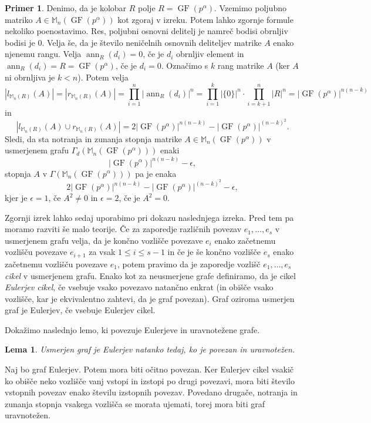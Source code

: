 \documentclass[a4paper, 12pt]{amsart}
\theoremstyle{definition} %
\newtheorem{primer}[definicija]{Primer}
\theoremstyle{plain} %
\newtheorem{lema}[definicija]{Lema}
\newcommand{\M}{\mathbb M}
\DeclareMathOperator{\ann}{ann}
\DeclareMathOperator{\GF}{GF}
\begin{document}
\begin{primer}
Denimo, da je kolobar $R$ polje $R=\GF(p^{\alpha})$. Vzemimo poljubno matriko $A\in \M_n(\GF(p^{\alpha}))$ kot zgoraj v izreku. Potem lahko zgornje formule nekoliko poenostavimo. Res, poljubni osnovni delitelj je namreč bodisi obrnljiv bodisi je 0. Velja še, da je število neničelnih osnovnih deliteljev matrike $A$ enako njenemu rangu. Velja $\ann_R(d_i) = 0$, če je $d_i$ obrnljiv element in $\ann_R(d_i) = R=\GF(p^{\alpha})$, če je $d_i=0$. Označimo s $k$ rang matrike $A$ (ker $A$ ni obrnljiva je $k<n$). Potem velja 
$$
|l_{\M_n(R)}(A)| = |r_{\M_n(R)}(A)|=\prod_{i=1}^n|\ann_R(d_i)|^n = \prod_{i=1}^k |\{0\}|^n\cdot \prod_{i=k+1}^n |R|^{n} =|\GF(p^{\alpha})|^{n(n-k)}
$$
in
$$
|l_{\M_n(R)} (A) \cup r_{\M_n(R)}(A)| = 2|\GF(p^{\alpha})|^{n(n-k)} - |\GF(p^{\alpha})|^{(n-k)^2}.
$$
Sledi, da sta notranja in zunanja stopnja matrike $A\in \M_n(\GF(p^{\alpha}))$ v usmerjenem grafu $\Gamma_d(\M_n(\GF(p^{\alpha})))$ enaki 
$$
|\GF(p^{\alpha})|^{n(n-k)} - \epsilon,
$$
stopnja $A$ v $\Gamma (\M_n(\GF(p^{\alpha})))$ pa je enaka
$$
 2|\GF(p^{\alpha})|^{n(n-k)} - |\GF(p^{\alpha})|^{(n-k)^2} - \epsilon,
$$
kjer je $\epsilon=1$, če $A^2\neq 0$ in $\epsilon = 2$, če je $A^2 = 0$. 
\end{primer}

Zgornji izrek lahko sedaj uporabimo pri dokazu naslednjega izreka. Pred tem pa moramo razviti še malo teorije. Če za zaporedje različnih povezav $e_1, \dots, e_s$ v usmerjenem grafu velja, da je končno vozlišče povezave $e_i$ enako začetnemu vozlišču povezave $e_{i+1}$ za vsak $1 \le i \le s-1$ in če je še končno vozlišče $e_s$ enako začetnemu vozlišču povezave $e_1$, potem pravimo da je zaporedje vozlišč $e_1,\dots,e_s$ \emph{cikel} v usmerjenem grafu. Enako kot za neusmerjene grafe definiramo, da je cikel \emph{Eulerjev cikel}, če vsebuje vsako povezavo natančno enkrat (in obišče vsako vozlišče, kar je ekvivalentno zahtevi, da je graf povezan). Graf oziroma usmerjen graf je Eulerjev, če vsebuje Eulerjev cikel.

Dokažimo naslednjo lemo, ki povezuje Eulerjeve in uravnotežene grafe.
\begin{lema}
\label{usmerjenGrafEuler}
Usmerjen graf je Eulerjev natanko tedaj, ko je povezan in uravnotežen.
\end{lema}

\proof
Naj bo graf Eulerjev. Potem mora biti očitno povezan. Ker Eulerjev cikel vsakič ko obišče neko vozlišče vanj vstopi in izstopi po drugi povezavi, mora biti število vstopnih povezav enako številu izstopnih povezav. Povedano drugače, notranja in zunanja stopnja vsakega vozlišča se morata ujemati, torej mora biti graf uravnotežen.
\end{document}
